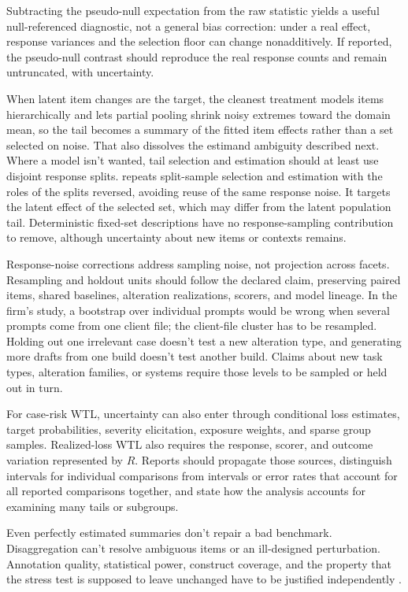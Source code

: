 \documentclass[12pt]{article}
\begin{document}
Subtracting the pseudo-null expectation from the raw statistic yields a useful null-referenced diagnostic, not a general bias correction: under a real effect, response variances and the selection floor can change nonadditively. If reported, the pseudo-null contrast should reproduce the real response counts and remain untruncated, with uncertainty.

When latent item changes are the target, the cleanest treatment models items hierarchically and lets partial pooling shrink noisy extremes toward the domain mean, so the tail becomes a summary of the fitted item effects rather than a set selected on noise. That also dissolves the estimand ambiguity described next. Where a model isn't wanted, tail selection and estimation should at least use disjoint response splits.  repeats split-sample selection and estimation with the roles of the splits reversed, avoiding reuse of the same response noise. It targets the latent effect of the selected set, which may differ from the latent population tail. Deterministic fixed-set descriptions have no response-sampling contribution to remove, although uncertainty about new items or contexts remains.

Response-noise corrections address sampling noise, not projection across facets. Resampling and holdout units should follow the declared claim, preserving paired items, shared baselines, alteration realizations, scorers, and model lineage. In the firm's study, a bootstrap over individual prompts would be wrong when several prompts come from one client file; the client-file cluster has to be resampled. Holding out one irrelevant case doesn't test a new alteration type, and generating more drafts from one build doesn't test another build. Claims about new task types, alteration families, or systems require those levels to be sampled or held out in turn.

For case-risk WTL, uncertainty can also enter through conditional loss estimates, target probabilities, severity elicitation, exposure weights, and sparse group samples. Realized-loss WTL also requires the response, scorer, and outcome variation represented by \(R\). Reports should propagate those sources, distinguish intervals for individual comparisons from intervals or error rates that account for all reported comparisons together, and state how the analysis accounts for examining many tails or subgroups.

Even perfectly estimated summaries don't repair a bad benchmark. Disaggregation can't resolve ambiguous items or an ill-designed perturbation. Annotation quality, statistical power, construct coverage, and the property that the stress test is supposed to leave unchanged have to be justified independently \citep{bowmanDahl2021benchmarking}.
\end{document}
